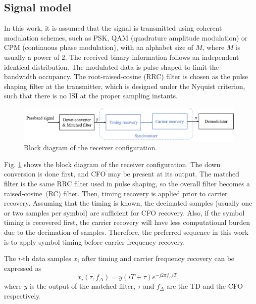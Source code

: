 \documentclass[journal,comsoc,onecolumn, 12pt,draftclsnofoot]{IEEEtran}
\begin{document}
\subsection{Signal model }  


In this work, it is assumed that the signal is transmitted using coherent modulation schemes, such as PSK, QAM (quadrature amplitude modulation) or CPM (continuous phase modulation), with an alphabet size of \(M\), where \(M\) is usually a power of 2.
The received binary information follows an independent identical distribution.
The modulated data is pulse shaped to limit the bandwidth occupancy.
The root-raised-cosine (RRC) filter is chosen as the pulse shaping filter at the transmitter, which is designed under the Nyquist criterion, 
such that there is no ISI at the proper sampling instants.

\begin{figure}[ht]
\centering
\includegraphics[width=5.5 in]{pic/sys_conf.png}
\caption{Block diagram of the receiver configuration.}
\label{fig:sysconf} 
\end{figure}

Fig. \ref{fig:sysconf} shows the block diagram of the receiver configuration.
The down conversion is done first, and CFO may be present at its output.
The matched filter is the same RRC filter used in pulse shaping, so the overall filter becomes a raised-cosine~(RC) filter. 
Then, timing recovery is applied prior to carrier recovery.
Assuming that the timing is known, the decimated samples (usually one or two samples per symbol) are sufficient for CFO recovery.
Also, if the symbol timing is recovered first, the carrier recovery will have less computational burden due to the decimation of samples.
Therefore, the preferred sequence in this work is to apply symbol timing before carrier frequency recovery.

The $i$-th data samples \(x_i\) after timing and carrier frequency recovery can be expressed as
\begin{equation}
{x_i}( \tau ,{f_\Delta }) = y(iT +  \tau ){e^{ - j2\pi {f_\Delta }iT}},
\end{equation}
where \(y\) is the output of the matched filter, \(\tau\) and \(f_\Delta\) are the TD and the CFO respectively.
\end{document}
